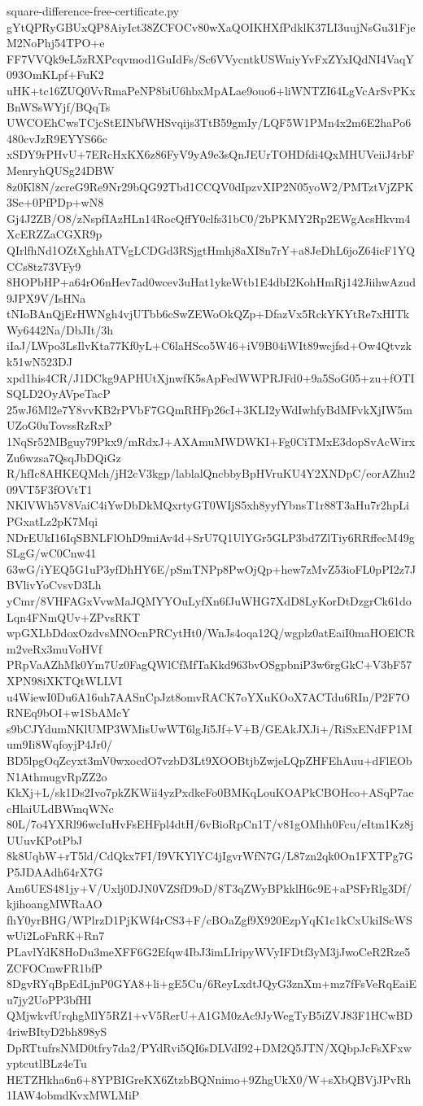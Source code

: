 \documentclass[11pt]{article}
\theoremstyle{definition}
\theoremstyle{remark}
\begin{document}
\begin{filecontents*}[overwrite]{square-difference-free-certificate.py}
gYtQPRyGBUxQP8AiyIct38ZCFOCv80wXaQOIKHXfPdklK37LI3uujNsGu31FjeM2NoPhj54TPO+e
FF7VVQk9eL5zRXPcqvmod1GuIdFs/Sc6VVycntkUSWniyYvFxZYxIQdNI4VaqY093OmKLpf+FuK2
uHK+tc16ZUQ0VvRmaPeNP8biU6hbxMpALae9ouo6+liWNTZI64LgVcArSvPKxBnWSsWYjf/BQqTs
UWCOEhCwsTCjcStEINbfWHSvqijs3TtB59gmIy/LQF5W1PMn4x2m6E2haPo6480cvJzR9EYYS66c
xSDY9rPHvU+7ERcHxKX6z86FyV9yA9e3sQnJEUrTOHDfdi4QxMHUVeiiJ4rbFMenryhQUSg24DBW
8z0Kl8N/zcreG9Re9Nr29bQG92Tbd1CCQV0dIpzvXIP2N05yoW2/PMTztVjZPK3Se+0PfPDp+wN8
Gj4J2ZB/O8/zNspfIAzHLn14RocQffY0clfs31bC0/2bPKMY2Rp2EWgAcsHkvm4XcERZZaCGXR9p
QIrlfhNd1OZtXghhATVgLCDGd3RSjgtHmhj8aXI8n7rY+a8JeDhL6joZ64icF1YQCCs8tz73VFy9
8HOPbHP+a64rO6nHev7ad0wcev3uHat1ykeWtb1E4dbI2KohHmRj142JiihwAzud9JPX9V/IsHNa
tNIoBAnQjErHWNgh4vjUTbb6cSwZEWoOkQZp+DfazVx5RckYKYtRe7xHITkWy6442Na/DbJIt/3h
iIaJ/LWpo3LsIlvKta77Kf0yL+C6laHSco5W46+iV9B04iWIt89wcjfsd+Ow4Qtvzkk51wN523DJ
xpd1his4CR/J1DCkg9APHUtXjnwfK5sApFedWWPRJFd0+9a5SoG05+zu+fOTISQLD2OyAVpeTacP
25wJ6Ml2e7Y8vvKB2rPVbF7GQmRHFp26cI+3KLI2yWdIwhfyBdMFvkXjIW5mUZoG0uTovssRzRxP
1NqSr52MBguy79Pkx9/mRdxJ+AXAmuMWDWKI+Fg0CiTMxE3dopSvAcWirxZu6wzsa7QsqJbDQiGz
R/hfIc8AHKEQMch/jH2cV3kgp/lablalQncbbyBpHVruKU4Y2XNDpC/eorAZhu209VT5F3fOVtT1
NKlVWh5V8VaiC4iYwDbDkMQxrtyGT0WIjS5xh8yyfYbnsT1r88T3aHu7r2hpLiPGxatLz2pK7Mqi
NDrEUkI16IqSBNLFlOhD9miAv4d+SrU7Q1UlYGr5GLP3bd7ZlTiy6RRffecM49gSLgG/wC0Cnw41
63wG/iYEQ5G1uP3yfDhHY6E/pSmTNPp8PwOjQp+hew7zMvZ53ioFL0pPI2z7JBVlivYoCvsvD3Lh
yCmr/8VHFAGxVvwMaJQMYYOuLyfXn6fJuWHG7XdD8LyKorDtDzgrCk61doLqn4FNmQUv+ZPvsRKT
wpGXLbDdoxOzdvsMNOcnPRCytHt0/WnJs4oqa12Q/wgplz0atEaiI0maHOElCRm2veRx3muVoHVf
PRpVaAZhMk0Ym7Uz0FagQWlCfMfTaKkd963bvOSgpbniP3w6rgGkC+V3bF57XPN98iXKTQtWLLVI
u4WiewI0Du6A16uh7AASnCpJzt8omvRACK7oYXuKOoX7ACTdu6RIn/P2F7ORNEq9bOI+w1SbAMcY
s9bCJYdumNKlUMP3WMisUwWT6lgJi5Jf+V+B/GEAkJXJi+/RiSxENdFP1Mum9Ii8WqfoyjP4Jr0/
BD5lpgOqZcyxt3mV0wxocdO7vzbD3Lt9XOOBtjbZwjeLQpZHFEhAuu+dFlEObN1AthmugvRpZZ2o
KkXj+L/sk1Ds2Ivo7pkZKWii4yzPxdkeFo0BMKqLouKOAPkCBOHco+ASqP7aecHlaiULdBWmqWNc
80L/7o4YXRl96wcIuHvFsEHFpl4dtH/6vBioRpCn1T/v81gOMhh0Fcu/eItm1Kz8jUUuvKPotPbJ
8k8UqbW+rT5ld/CdQkx7FI/I9VKYlYC4jIgvrWfN7G/L87zn2qk0On1FXTPg7GP5JDAAdh64rX7G
Am6UES481jy+V/Uxlj0DJN0VZSfD9oD/8T3qZWyBPkklH6c9E+aPSFrRlg3Df/kjihoangMWRaAO
fhY0yrBHG/WPlrzD1PjKWf4rCS3+F/cBOaZgf9X920EzpYqK1c1kCxUkiIScWSwUi2LoFnRK+Rn7
PLavlYdK8HoDu3meXFF6G2Efqw4IbJ3imLIripyWVyIFDtf3yM3jJwoCeR2Rze5ZCFOCmwFR1bfP
8DgvRYqBpEdLjnP0GYA8+li+gE5Cu/6ReyLxdtJQyG3znXm+mz7fFsVeRqEaiEu7jy2UoPP3bfHI
QMjwkvfUrqhgMlY5RZ1+vV5RerU+A1GM0zAc9JyWegTyB5iZVJ83F1HCwBD4riwBItyD2bh898yS
DpRTtufrsNMD0tfry7da2/PYdRvi5QI6sDLVdI92+DM2Q5JTN/XQbpJcFsXFxwyptcutlBLz4eTu
HETZHkha6n6+8YPBIGreKX6ZtzbBQNnimo+9ZhgUkX0/W+sXbQBVjJPvRh1IAW4obmdKvxMWLMiP

\end{filecontents*}
\end{document}
